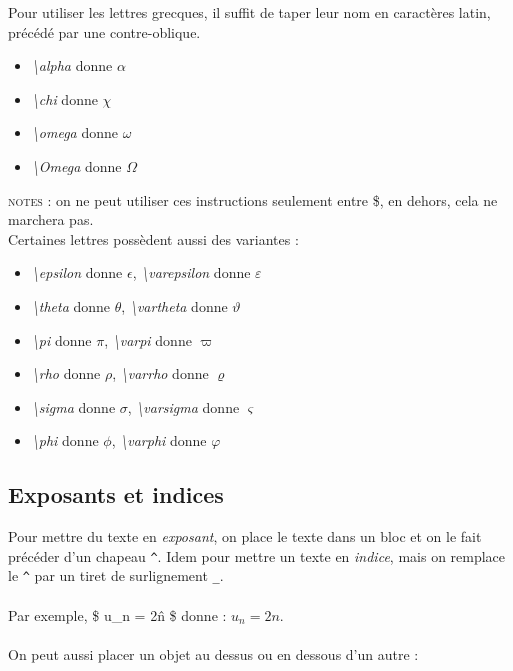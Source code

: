 \documentclass[a4paper, 10pt]{book}
\begin{document}
Pour utiliser les lettres grecques, il suffit de taper leur nom en caractères latin, précédé par une contre-oblique.\\

\begin{itemize}
\item \textit{\textbackslash alpha} donne \texttt{$\alpha$}
\item \textit{\textbackslash chi} donne \texttt{$\chi$}
\item \textit{\textbackslash omega} donne \texttt{$\omega$}
\item \textit{\textbackslash Omega} donne \texttt{$\Omega$}\\
\end{itemize}

\textsc{notes :} on ne peut utiliser ces instructions seulement entre \$, en dehors, cela ne marchera pas.\\ 

Certaines lettres possèdent aussi des variantes :\\

\begin{itemize}
\item \textit{\textbackslash epsilon} donne \texttt{$ \epsilon$}, \textit{\textbackslash varepsilon} donne \texttt{$\varepsilon$}
\item \textit{\textbackslash theta} donne \texttt{$ \theta$}, \textit{\textbackslash vartheta} donne \texttt{$\vartheta$}
\item \textit{\textbackslash pi} donne \texttt{$\pi$}, \textit{\textbackslash varpi} donne \texttt{$ \varpi$}
\item \textit{\textbackslash rho} donne \texttt{$\rho$}, \textit{\textbackslash varrho} donne \texttt{$\varrho$}
\item \textit{\textbackslash sigma} donne \texttt{$\sigma$}, \textit{\textbackslash varsigma} donne \texttt{$\varsigma$} 
\item \textit{\textbackslash phi} donne \texttt{$\phi$}, \textit{\textbackslash varphi} donne \texttt{$\varphi$}
\end{itemize}

\subsection{Exposants et indices}

Pour mettre du texte en \textit{exposant}, on place le texte dans un bloc et on le fait précéder d'un chapeau \texttt{\^}. Idem pour mettre un texte en \textit{indice}, mais on remplace le \texttt{\^} par un tiret de surlignement \texttt{\_}. \\ \\
Par exemple, \$ u\_n = 2\^ n \$ donne : $ u_n = 2n$. \\ \\
On peut aussi placer un objet au dessus ou en dessous d'un autre : \\
\end{document}
